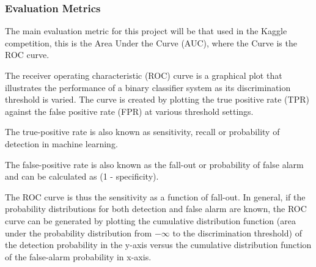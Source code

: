 \documentclass[]{article}
\begin{document}
\subsubsection{Evaluation Metrics}\label{evaluation-metrics}

The main evaluation metric for this project will be that used in the Kaggle competition, this is the Area Under the Curve (AUC), where the Curve is the ROC curve.

The receiver operating characteristic (ROC) curve is a graphical plot that illustrates the performance of a binary classifier system as its discrimination threshold is varied. The curve is created by plotting the true positive rate (TPR) against the false positive rate (FPR) at various threshold settings.

The true-positive rate is also known as sensitivity, recall or probability of detection in machine learning.

The false-positive rate is also known as the fall-out or probability of false alarm and can be calculated as (1 - specificity). 

The ROC curve is thus the sensitivity as a function of fall-out. In general, if the probability distributions for both detection and false alarm are known, the ROC curve can be generated by plotting the cumulative distribution function (area under the probability distribution from $-\infty$  to the discrimination threshold) of the detection probability in the y-axis versus the cumulative distribution function of the false-alarm probability in x-axis.  \cite{wikiROC}
\end{document}
